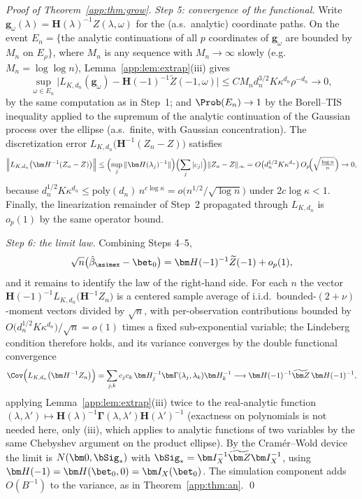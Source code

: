 \begin{proof}[Proof of Theorem~\ref{app:thm:grow}]
\emph{Step 5: convergence of the functional.} Write
$\bm g_\omega(\lambda)=\bm H(\lambda)^{-1}Z(\lambda,\omega)$ for the
(a.s.\ analytic) coordinate paths. On the event
$E_n=\{$the analytic continuations of all $p$ coordinates of
$\bm g_\omega$ are bounded by $M_n$ on $E_\rho\}$, where
$M_n$ is any sequence with $M_n\to\infty$ slowly
(e.g.\ $M_n=\log\log n$), Lemma~\ref{app:lem:extrap}(iii) gives
\[
  \sup_{\omega\in E_n}\bigl|L_{K,d_n}(\bm g_\omega)
  -\bm H(-1)^{-1}\widetilde Z(-1,\omega)\bigr|
  \le C M_n d_n^{3/2}K\kappa^{d_n}\rho^{-d_n}\longrightarrow 0,
\]
by the same computation as in Step~1; and
$\Prob(E_n)\to1$ by the Borell--TIS inequality applied to the
supremum of the analytic continuation of the Gaussian process over the
ellipse (a.s.\ finite, with Gaussian concentration).
The discretization error
$L_{K,d_n}\bigl(\bm H^{-1}(Z_n-Z)\bigr)$ satisfies
\[
  \Bigl\|L_{K,d_n}\bigl(\bm H^{-1}(Z_n-Z)\bigr)\Bigr\|
  \le\Bigl(\sup_j\|\bm H(\lambda_j)^{-1}\|\Bigr)
     \Bigl(\sum_j|c_j|\Bigr)\|Z_n-Z\|_\infty
  =O\bigl(d_n^{1/2}K\kappa^{d_n}\bigr)\,O_p\!\Bigl(\sqrt{\tfrac{\log n}{n}}\Bigr)
  \to0,
\]
because $d_n^{1/2}K\kappa^{d_n}\le\mathrm{poly}(d_n)\,
n^{c\log\kappa}=o\bigl(n^{1/2}/\sqrt{\log n}\bigr)$ under
$2c\log\kappa<1$. Finally, the linearization remainder of Step~2
propagated through $L_{K,d_n}$ is $o_p(1)$ by the same operator bound.

\emph{Step 6: the limit law.} Combining Steps 4--5,
\[
  \sqrt n\bigl(\hat\beta_{\asimex}-\bet_0\bigr)
  =\bm H(-1)^{-1}\widetilde Z(-1)+o_p(1),
\]
and it remains to identify the law of the right-hand side. For each $n$
the vector $\bm H(-1)^{-1}L_{K,d_n}\bigl(\bm H^{-1}Z_n\bigr)$ is a
centered sample average of i.i.d.\ bounded-$(2+\nu)$-moment vectors
divided by $\sqrt n$, with per-observation contributions bounded by
$O\bigl(d_n^{1/2}K\kappa^{d_n}\bigr)/\sqrt n=o(1)$ times a fixed
sub-exponential variable; the Lindeberg condition therefore holds, and
its variance converges by the double functional convergence
\[
  \Cov\Bigl(L_{K,d_n}\bigl(\bm H^{-1}Z_n\bigr)\Bigr)
  =\sum_{j,k}c_jc_k\,\bm H_j^{-1}\bm\Gamma(\lambda_j,\lambda_k)\bm H_k^{-1}
  \longrightarrow
  \bm H(-1)^{-1}\widetilde{\bm Z}\,\bm H(-1)^{-1},
\]
applying Lemma~\ref{app:lem:extrap}(iii) twice to the real-analytic
function $(\lambda,\lambda')\mapsto
\bm H(\lambda)^{-1}\bm\Gamma(\lambda,\lambda')\bm H(\lambda')^{-1}$
(exactness on polynomials is not needed here, only (iii), which applies
to analytic functions of two variables by the same Chebyshev argument on
the product ellipse). By the Cram\'er--Wold device the limit is
$N(\bm 0,\bSig_*)$ with $\bSig_*=\bm I_X^{-1}\widetilde{\bm Z}\bm
I_X^{-1}$, using $\bm H(-1)=\bm H(\bet_0,0)=\bm I_X(\bet_0)$. The
simulation component adds $O(B^{-1})$ to the variance, as in
Theorem~\ref{app:thm:an}. \qed
\end{proof}

